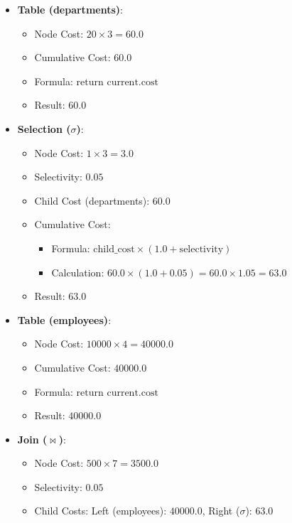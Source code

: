 \documentclass[12pt,a4paper]{article}
\begin{document}
\begin{itemize}
    \item \textbf{Table (departments)}:
        \begin{itemize}
            \item Node Cost: $20 \times 3 = 60.0$
            \item Cumulative Cost: $60.0$
            \item Formula: $\text{return current.cost}$
            \item Result: $60.0$
        \end{itemize}
    \item \textbf{Selection ($\sigma$)}:
        \begin{itemize}
            \item Node Cost: $1 \times 3 = 3.0$
            \item Selectivity: $0.05$
            \item Child Cost (departments): $60.0$
            \item Cumulative Cost:
                \begin{itemize}
                    \item Formula: $\text{child\_cost} \times (1.0 + \text{selectivity})$
                    \item Calculation: $60.0 \times (1.0 + 0.05) = 60.0 \times 1.05 = 63.0$
                \end{itemize}
            \item Result: $63.0$
        \end{itemize}
        \newpage
    \item \textbf{Table (employees)}:
        \begin{itemize}
            \item Node Cost: $10000 \times 4 = 40000.0$
            \item Cumulative Cost: $40000.0$
            \item Formula: $\text{return current.cost}$
            \item Result: $40000.0$
        \end{itemize}
    \item \textbf{Join ($\bowtie$)}:
        \begin{itemize}
            \item Node Cost: $500 \times 7 = 3500.0$
            \item Selectivity: $0.05$
            \item Child Costs: Left (employees): $40000.0$, Right ($\sigma$): $63.0$

\end{itemize}
\end{itemize}
\end{document}
